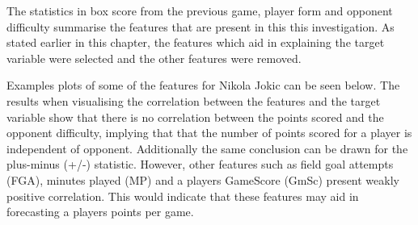 \documentclass[a4paper,11pt,twoside]{article}
\begin{document}
The statistics in box score from the previous game, player form and opponent difficulty summarise the features that are present in this this investigation. As stated earlier in this chapter,  the features which aid in explaining the target variable were selected and the other features were removed.

Examples plots of some of the features for Nikola Jokic can be seen below. The results when visualising the correlation between the features and the target variable show that there is no correlation between the points scored and the opponent difficulty, implying that that the number of points scored for a player is independent of opponent. Additionally the same conclusion can be drawn for the plus-minus (+/-) statistic. However, other features such as field goal attempts (FGA), minutes played (MP) and a players GameScore (GmSc) present weakly positive correlation. This would indicate that these features may aid in forecasting a players points per game. 
\end{document}

